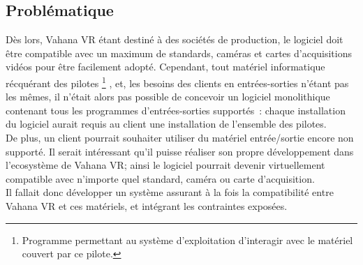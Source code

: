\subsection{Problématique}
Dès lors, Vahana VR étant destiné à des sociétés de production, le logiciel doit
être compatible avec un maximum de standards, caméras et cartes d'acquisitions vidéos
pour être facilement adopté. Cependant, tout matériel informatique récquérant des pilotes
\footnote{Programme permettant au système d'exploitation d'interagir avec le matériel couvert par ce pilote\cite{pilote-informatique}.}
, et, les besoins des clients en entrées-sorties n'étant pas les mêmes, il n'était
alors pas possible de concevoir un logiciel monolithique contenant tous les programmes 
d'entrées-sorties supportés~: chaque installation du logiciel aurait requis au client 
une installation de l'ensemble des pilotes.\\
De plus, un client pourrait souhaiter utiliser du matériel entrée/sortie encore
non supporté. Il serait intéressant qu'il puisse réaliser son propre développement
dans l'ecosystème de Vahana VR; ainsi le logiciel pourrait devenir virtuellement
compatible avec n'importe quel standard, caméra ou carte d'acquisition.\\
Il fallait donc développer un système assurant à la fois la compatibilité
entre Vahana VR et ces matériels, et intégrant les contraintes exposées.\\

